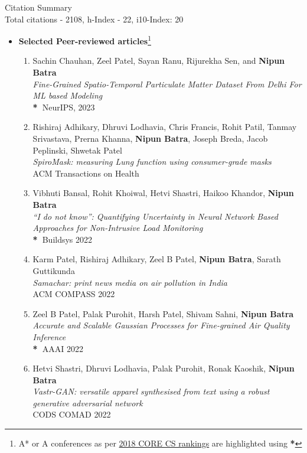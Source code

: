 \documentclass[letter,10pt]{article}
\begin{document}
Citation Summary\\ 
Total citations - 2108, h-Index - 22, i10-Index: 20

\begin{itemize}
    \item[]\textbf{Selected Peer-reviewed articles}\footnote{A* or A conferences as per \href{http://portal.core.edu.au/conf-ranks/} {2018 CORE CS rankings} are highlighted using \textbf{*}}  
    \begin{enumerate}

    \item{Sachin Chauhan, Zeel Patel, Sayan Ranu, Rijurekha Sen, and \textbf{Nipun Batra}}\\
    \textit{Fine-Grained Spatio-Temporal Particulate Matter Dataset From Delhi For ML based Modeling}\\
    \textbf{*~}{NeurIPS, 2023}



    \item{Rishiraj Adhikary, Dhruvi Lodhavia, Chris Francis, Rohit Patil, Tanmay Srivastava, Prerna Khanna, \textbf{Nipun Batra}, Joseph Breda, Jacob Peplinski, Shwetak Patel}\\
    \textit{SpiroMask: measuring Lung function using consumer-grade masks}\\
      {ACM Transactions on Health}

\item{Vibhuti Bansal, Rohit Khoiwal,
  Hetvi Shastri,
  Haikoo Khandor,
  \textbf{Nipun Batra}}\\
    \textit{``I do not know'': Quantifying Uncertainty in Neural Network 
  Based Approaches for Non-Intrusive Load Monitoring}\\
      \textbf{*~}{Buildsys 2022}


\item{Karm Patel, Rishiraj Adhikary, Zeel B Patel, \textbf{Nipun Batra}, Sarath Guttikunda}\\
    \textit{Samachar: print news media on air pollution in India}\\
    {ACM COMPASS 2022}

 \item{Zeel B Patel, Palak Purohit, Harsh Patel, Shivam Sahni, \textbf{Nipun Batra}}\\
    \textit{Accurate and Scalable Gaussian Processes for Fine-grained Air Quality Inference}\\
    \textbf{*~}{AAAI 2022}

\item{Hetvi Shastri, Dhruvi Lodhavia, Palak Purohit, Ronak Kaoshik, \textbf{Nipun Batra}
}\\
\textit{Vastr-GAN: versatile apparel synthesised from text using a robust generative adversarial network}\\
    {CODS COMAD 2022}



\end{enumerate}
\end{itemize}
\end{document}
